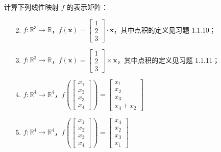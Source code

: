 	\newpage
	\begin{exercise}[1.2.5]
		计算下列线性映射 $f$ 的表示矩阵：
		\begin{enumerate}
			\item[2.] $f:\mathbb{R}^3\rightarrow\mathbb{R}$，$f(\boldsymbol{x})=\begin{bmatrix}
				1\\2\\3
			\end{bmatrix}\cdot\boldsymbol{x}$，其中点积的定义见习题 1.1.10；
			\item[3.] $f:\mathbb{R}^3\rightarrow\mathbb{R}$，$f(\boldsymbol{x})=\begin{bmatrix}
				1\\2\\3
			\end{bmatrix}\times\boldsymbol{x}$，其中点积的定义见习题 1.1.11；
			\item[4.] $f:\mathbb{R}^4\rightarrow\mathbb{R}^4$，$f\left(\begin{bmatrix}
				x_1\\x_2\\x_3\\x_4
			\end{bmatrix}\right)=\begin{bmatrix}
				x_1\\x_2\\x_3\\x_4+x_2
			\end{bmatrix}$
			\item[5.] $f:\mathbb{R}^4\rightarrow\mathbb{R}^4$，$f\left(\begin{bmatrix}
				x_1\\x_2\\x_3\\x_4
			\end{bmatrix}\right)=\begin{bmatrix}
				x_4\\x_2\\x_3\\x_1
			\end{bmatrix}$
	
		\end{enumerate}
	\end{exercise}
